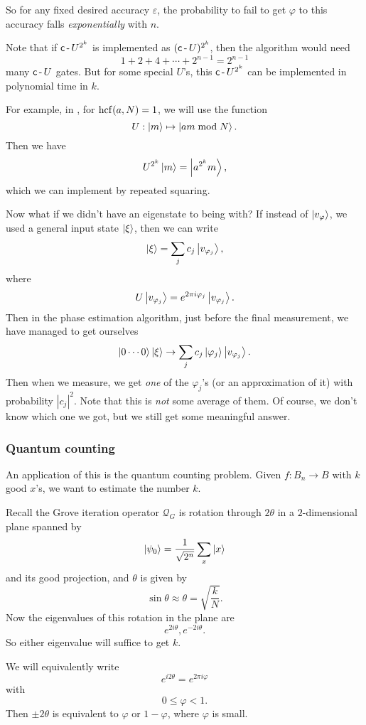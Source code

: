 So for any fixed desired accuracy $\varepsilon$, the probability to fail to get $\varphi$ to this accuracy falls \emph{exponentially} with $n$.

Note that if $\mathsf{c}\operatorname{-} U^{2^k}$ is implemented as $(\mathsf{c}\operatorname{-} U)^{2^k}$, then the algorithm would need
\[
  1 + 2 + 4 + \cdots + 2^{n - 1} = 2^{n - 1}
\]
many $\mathsf{c}\operatorname{-} U$ gates. But for some special $U$'s, this $\mathsf{c}\operatorname{-} U^{2^k}$ can be implemented in polynomial time in $k$.

For example, in , for $\operatorname{hcf}(a, N) = 1$, we will use the function
\[
  U: \left\lvert m\right\rangle \mapsto \left\lvert am \bmod N\right\rangle.
\]
Then we have
\[
  U^{2^k}\left\lvert m\right\rangle = \left\lvert a^{2^k}m\right\rangle,
\]
which we can implement by repeated squaring.

Now what if we didn't have an eigenstate to being with? If instead of $\left\lvert v_\varphi\right\rangle$, we used a general input state $\left\lvert \xi\right\rangle$, then we can write
\[
  \left\lvert \xi\right\rangle = \sum_j c_j \left\lvert v_{\varphi_j}\right\rangle,
\]
where
\[
  U \left\lvert v_{\varphi_j}\right\rangle = e^{2\pi i \varphi_j}\left\lvert v_{\varphi_j}\right\rangle.
\]
Then in the phase estimation algorithm, just before the final measurement, we have managed to get ourselves
\[
  \left\lvert 0\cdots0\right\rangle\left\lvert \xi\right\rangle \to \sum_j c_j \left\lvert \varphi_j\right\rangle \left\lvert v_{\varphi_j}\right\rangle.
\]
Then when we measure, we get \emph{one} of the $\varphi_j$'s (or an approximation of it) with probability $|c_j|^2$. Note that this is \emph{not} some average of them. Of course, we don't know which one we got, but we still get some meaningful answer.

\subsubsection*{Quantum counting}
An application of this is the quantum counting problem. Given $f: B_n \to B$ with $k$ good $x$'s, we want to estimate the number $k$.

Recall the Grove iteration operator $\mathcal{Q}_G$ is rotation through $2\theta$ in a $2$-dimensional plane spanned by
\[
  \left\lvert \psi_0\right\rangle = \frac{1}{\sqrt{2^n}} \sum_x \left\lvert x\right\rangle
\]
and its good projection, and $\theta$ is given by
\[
  \sin \theta \approx \theta = \sqrt{\frac{k}{N}}.
\]
Now the eigenvalues of this rotation in the plane are
\[
  e^{2i \theta}, e^{-2i\theta}.
\]
So either eigenvalue will suffice to get $k$.

We will equivalently write
\[
  e^{i2\theta} = e^{2\pi i \varphi}
\]
with
\[
  0 \leq \varphi < 1.
\]
Then $\pm 2 \theta$ is equivalent to $\varphi$ or $1 - \varphi$, where $\varphi$ is small.

